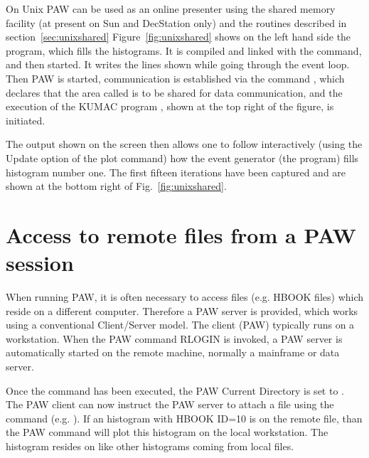 On Unix PAW can be used as an online presenter
using the shared memory facility 
(at present on Sun and DecStation only)
and the routines described in section~\ref{sec:unixshared}
%
Figure~\ref{fig:unixshared} shows on the left hand side
the program, which fills the histograms.
It is compiled and linked with the  command,
and then started. 
It writes the lines shown while going through the event loop.
Then PAW is started, communication is established via the command
, 
%
which declares that the area called 
is to be shared for data communication, and the execution
of the KUMAC program ,
shown at the top right of the figure, is initiated.

The output shown on the screen then allows one to follow interactively 
(using the Update option  of the plot command) how the
event generator (the  program) fills histogram number one.
The first fifteen iterations have been captured and are
shown at the bottom right of Fig.~\ref{fig:unixshared}.

\newpage

\section{Access to remote files from a PAW session}
 
When running PAW, it is often necessary to access files
(e.g. HBOOK files) which reside on a different computer. 
Therefore a PAW server is provided, which works using
a conventional Client/Server model. 
The client
(PAW) typically runs on a workstation. When the PAW command RLOGIN is invoked,
a PAW server is automatically started on the remote machine, normally
a mainframe or data server. 
 
Once the  command has been executed, the PAW Current Directory
is set to . The PAW client can now instruct the PAW server to
attach a file using the  command (e.g. ). If an
histogram with HBOOK ID=10 is on the remote file, than the PAW command
will plot this histogram on the local workstation. The histogram resides
on  like other histograms coming from local files.
 

